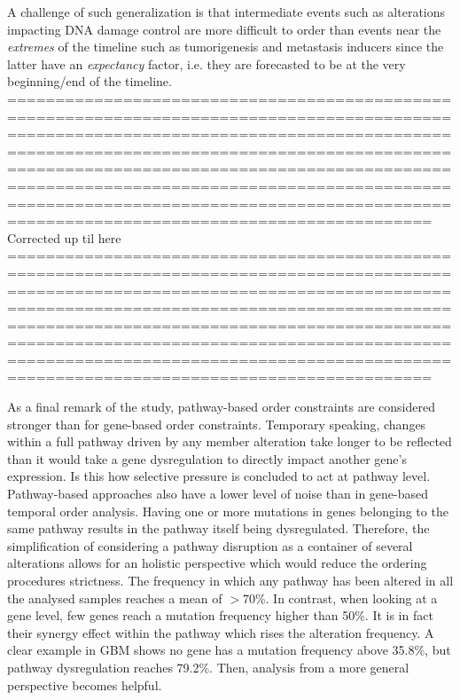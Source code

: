 A challenge of such generalization is that intermediate events such as alterations impacting DNA damage control are more difficult to order than events near the \textit{extremes} of the timeline such as tumorigenesis and metastasis inducers since the latter have an \textit{expectancy} factor, i.e. they are forecasted to be at the very beginning/end of the timeline.
\\

==============================================================================================================================================================================================================================================================================================================================================================================
Corrected up til here
==============================================================================================================================================================================================================================================================================================================================================================================

As a final remark of the study, pathway-based order constraints are considered stronger than for gene-based order constraints.
Temporary speaking, changes within a full pathway driven by any member alteration take longer to be reflected than it would take a gene dysregulation to directly impact another gene's expression. Is this how selective pressure is concluded to act at pathway level.
\\

Pathway-based approaches also have a lower level of noise than in gene-based temporal order analysis. Having one or more mutations in genes belonging to the same pathway results in the pathway itself being dysregulated. Therefore, the simplification of considering a pathway disruption as a container of several alterations allows for an holistic perspective which would reduce the ordering procedures strictness. The frequency in which any pathway has been altered in all the analysed samples reaches a mean of $>$70\%. In contrast, when looking at a gene level, few genes reach a mutation frequency higher than 50\%. It is in fact their synergy effect within the pathway which rises the alteration frequency. A clear example in GBM shows no gene has a mutation frequency above 35.8\%, but pathway dysregulation reaches 79.2\%. Then, analysis from a more general perspective becomes helpful.

